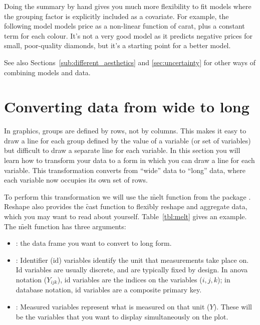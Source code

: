 Doing the summary by hand gives you much more flexibility to fit models where the grouping factor is explicitly included as a covariate. For example, the following model models price as a non-linear function of carat, plus a constant term for each colour. It's not a very good model as it predicts negative prices for small, poor-quality diamonds, but it's a starting point for a better model.

% 


See also Sections~\ref{sub:different_aesthetics} and \ref{sec:uncertainty} for other ways of combining models and data.

\section{Converting data from wide to long}
\label{sec:melting}

In \ggplot graphics, groups are defined by rows, not by columns. This makes it easy to draw a line for each group defined by the value of a variable (or set of variables) but difficult to draw a separate line for each variable. In this section you will learn how to transform your data to a form in which you can draw a line for each variable. This transformation converts from ``wide'' data to ``long'' data, where each variable now occupies its own set of rows.

To perform this transformation we will use the \f{melt} function from the  package \citep{wickham:2007b}. Reshape also provides the \f{cast} function to flexibly reshape and aggregate data, which you may want to read about yourself. Table~\ref{tbl:melt} gives an example. The \f{melt} function has three arguments:

\begin{itemize}

  \item {}: the data frame you want to convert to long form.

  \item {}: Identifier (id) variables identify the unit that measurements take place on. Id variables are usually discrete, and are typically fixed by design. In {\sc anova} notation ($Y_{ijk}$), id variables are the indices on the variables ($i, j, k$); in database notation, id variables are a composite primary key.

  \item {}: Measured variables represent what is measured on that unit ($Y$). These will be the variables that you want to display simultaneously on the plot.

\end{itemize}

